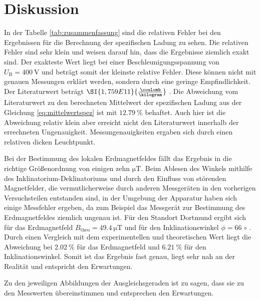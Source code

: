 \section{Diskussion}
\label{sec:Diskussion}

In der Tabelle \ref{tab:zusammenfassung} sind die relativen Fehler bei den Ergebnissen für die Berechnung der spezifischen Ladung zu sehen. Die relativen Fehler sind sehr klein und weisen darauf hin, dass die Ergebnisse ziemlich exakt sind. Der exakteste Wert liegt bei einer Beschleunigungsspannung von $U_\text{B} = \SI{400}{\volt}$ und beträgt somit der kleinste relative Fehler. Diese können nicht mit genauen Messungen erklärt werden, sondern durch eine geringe Empfindlichkeit.
Der Literaturwert beträgt $\SI{1,759E11}{\frac{\coulomb}{\kilogram}}$ \cite{spezifischeElektronenladung}. Die Abweichung vom Literaturwert zu den berechneten Mittelwert der spezifischen Ladung aus der Gleichung \ref{eq:mittelwertspez} ist mit $\SI{12,79}{\percent}$ behaftet. Auch hier ist die Abweichung relativ klein aber erreicht nicht den Literaturwert innerhalb der errechneten Ungenauigkeit. Messungenauigkeiten ergaben sich durch einen relativen dicken Leuchtpunkt. 

Bei der Bestimmung des lokalen Erdmagnetfeldes fällt das Ergebnis in die richtige Größenordnung von einigen zehn $\si{\micro\tesla}$. Beim Ablesen des Winkels mithilfe des Inklinatorium-Deklinatoriums und durch den Einfluss von störenden Magnetfelder, die vermutlicherweise durch anderen Messgeräten in den vorherigen Versuchsteilen entstanden sind, in der Umgebung der Apparatur haben sich einige Messfehler ergeben, da zum Beispiel das Messgerät zur Bestimmung des Erdmagnetfeldes ziemlich ungenau ist.
Für den Standort Dortmund ergibt sich für das Erdmagnetfeld $B_\text{theo} = \SI{49,4}{\micro\tesla}$ und für den Inklinationswinkel $\phi = 66$ $\circ$ \cite{Deklinationscalc}. Durch einen Vergleich mit dem experimentellen und theoretischen Wert liegt die Abweichung bei $\SI{2,02}{\percent}$ für das Erdmagnetfeld und $\SI{6,21}{\percent}$ für den Inklinationswinkel. Somit ist das Ergebnis fast genau, liegt sehr nah an der Realität und entspricht den Erwartungen. 

Zu den jeweiligen Abbildungen der Ausgleichsgeraden ist zu sagen, dass sie zu den Messwerten übereinstimmen und entsprechen den Erwartungen. 

